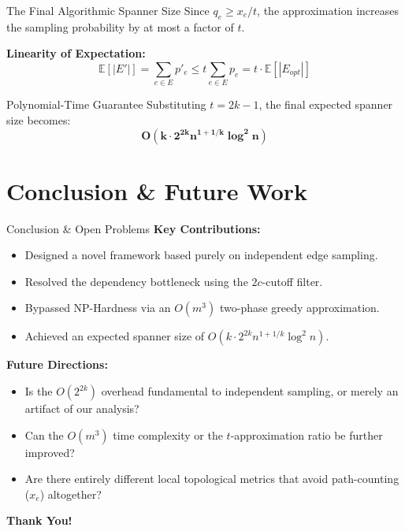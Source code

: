 \documentclass[10pt]{beamer}
\begin{document}
\begin{frame}{The Final Algorithmic Spanner Size}
    Since $q_e \ge x_e/t$, the approximation increases the sampling probability by at most a factor of $t$.
    
    \vspace{0.5cm}
    \textbf{Linearity of Expectation:}
    \[ 
    \mathbb{E}[|E'|] = \sum_{e \in E} p'_e \le t \sum_{e \in E} p_e = t \cdot \mathbb{E}[|E_{opt}|] 
    \]
    
    \vspace{0.6cm}
    \begin{exampleblock}{Polynomial-Time Guarantee}
        Substituting $t = 2k-1$, the final expected spanner size becomes:
        \[ \mathbf{O(k \cdot 2^{2k} n^{1+1/k} \log^2 n)} \]
    \end{exampleblock}
\end{frame}

\section{Conclusion & Future Work}

\begin{frame}{Conclusion \& Open Problems}
    \textbf{Key Contributions:}
    \begin{itemize}
        \item Designed a novel framework based purely on independent edge sampling.
        \item Resolved the dependency bottleneck using the $2c$-cutoff filter.
        \item Bypassed NP-Hardness via an $O(m^3)$ two-phase greedy approximation.
        \item Achieved an expected spanner size of $O(k \cdot 2^{2k} n^{1+1/k} \log^2 n)$.
    \end{itemize}

    \vspace{0.6cm}
    \textbf{Future Directions:}
    \begin{itemize}
        \item Is the $O(2^{2k})$ overhead fundamental to independent sampling, or merely an artifact of our analysis?
        \item Can the $O(m^3)$ time complexity or the $t$-approximation ratio be further improved?
        \item Are there entirely different local topological metrics that avoid path-counting ($x_e$) altogether?
    \end{itemize}
\end{frame}

\begin{frame}
    \vspace{1cm}
    \begin{center}
        \Huge \textbf{Thank You!} \\
    \end{center}
\end{frame}
\end{document}

